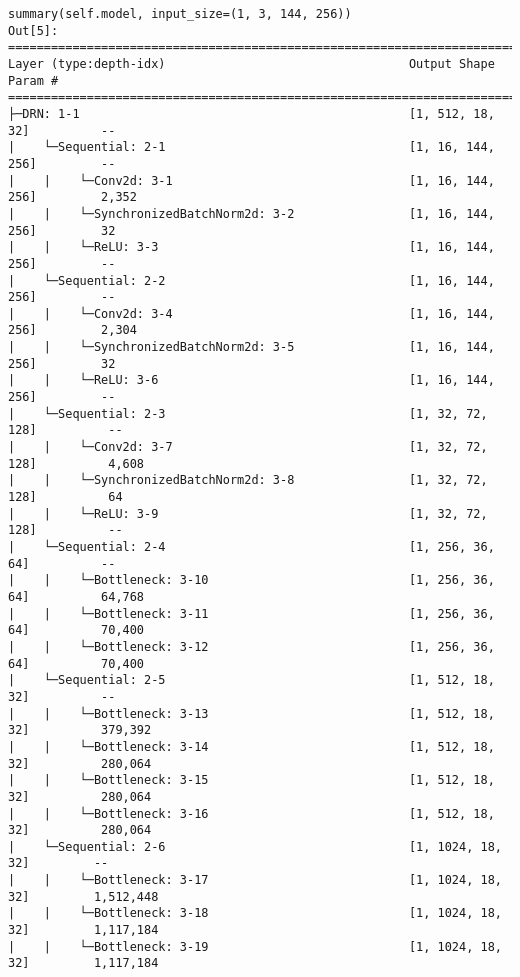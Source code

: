\begin{verbatim}
summary(self.model, input_size=(1, 3, 144, 256))
Out[5]: 
=========================================================================================================
Layer (type:depth-idx)                                  Output Shape              Param #
=========================================================================================================
├─DRN: 1-1                                              [1, 512, 18, 32]          --
|    └─Sequential: 2-1                                  [1, 16, 144, 256]         --
|    |    └─Conv2d: 3-1                                 [1, 16, 144, 256]         2,352
|    |    └─SynchronizedBatchNorm2d: 3-2                [1, 16, 144, 256]         32
|    |    └─ReLU: 3-3                                   [1, 16, 144, 256]         --
|    └─Sequential: 2-2                                  [1, 16, 144, 256]         --
|    |    └─Conv2d: 3-4                                 [1, 16, 144, 256]         2,304
|    |    └─SynchronizedBatchNorm2d: 3-5                [1, 16, 144, 256]         32
|    |    └─ReLU: 3-6                                   [1, 16, 144, 256]         --
|    └─Sequential: 2-3                                  [1, 32, 72, 128]          --
|    |    └─Conv2d: 3-7                                 [1, 32, 72, 128]          4,608
|    |    └─SynchronizedBatchNorm2d: 3-8                [1, 32, 72, 128]          64
|    |    └─ReLU: 3-9                                   [1, 32, 72, 128]          --
|    └─Sequential: 2-4                                  [1, 256, 36, 64]          --
|    |    └─Bottleneck: 3-10                            [1, 256, 36, 64]          64,768
|    |    └─Bottleneck: 3-11                            [1, 256, 36, 64]          70,400
|    |    └─Bottleneck: 3-12                            [1, 256, 36, 64]          70,400
|    └─Sequential: 2-5                                  [1, 512, 18, 32]          --
|    |    └─Bottleneck: 3-13                            [1, 512, 18, 32]          379,392
|    |    └─Bottleneck: 3-14                            [1, 512, 18, 32]          280,064
|    |    └─Bottleneck: 3-15                            [1, 512, 18, 32]          280,064
|    |    └─Bottleneck: 3-16                            [1, 512, 18, 32]          280,064
|    └─Sequential: 2-6                                  [1, 1024, 18, 32]         --
|    |    └─Bottleneck: 3-17                            [1, 1024, 18, 32]         1,512,448
|    |    └─Bottleneck: 3-18                            [1, 1024, 18, 32]         1,117,184
|    |    └─Bottleneck: 3-19                            [1, 1024, 18, 32]         1,117,184

\end{verbatim}
